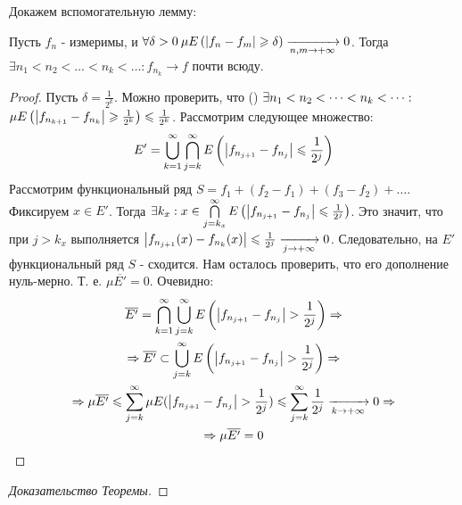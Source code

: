 Докажем вспомогательную лемму:

\begin{lemma}
	Пусть $f_n$ - измеримы, и $\forall\delta > 0\: \mu E\left(\left|f_n - f_m\right| \geqslant \delta\right) \xrightarrow[n,m \rightarrow +\infty]{} 0$.
	Тогда $\exists n_1 < n_2 < \dots < n_k < \dots : f_{n_k} \rightarrow f$ почти всюду.
\end{lemma}

\begin{proof}
	Пусть $\delta = \frac{1}{2^k}$. Можно проверить, что (\todo) 
	$\exists n_1 < n_2 < \dots < n_k < \dots: \\$
	$\mu E\left(\left|f_{n_{k + 1}} - f_{n_k}\right| \geqslant \frac{1}{2^k}\right) \leqslant \frac{1}{2^k}$.
	Рассмотрим следующее множество:
	\begin{gather*}
		E' = \bigcup\limits_{k = 1}^{\infty}\bigcap\limits_{j = k}^{\infty} E\left(\left|f_{n_{j + 1}} - f_{n_j}\right| \leqslant \frac{1}{2^j} \right)
	\end{gather*}
	Рассмотрим функциональный ряд $S = f_1 + (f_2 - f_1) + (f_3 - f_2) + \dots$. Фиксируем $x \in E'$. Тогда 
	$\\ \exists k_x : x \in \bigcap\limits_{j = k_x}^{\infty} E\left(\left|f_{n_{j + 1}} - f_{n_j}\right| \leqslant \frac{1}{2^j} \right)$.
	Это значит, что при $j > k_x$ выполняется $\left|f_{n_{j + 1}}(x) - f_{n_k}(x)\right| \leqslant \frac{1}{2^j} \xrightarrow[j \rightarrow +\infty]{} 0$.
	Следовательно, на $E'$ функциональный ряд $S$ - сходится. 
	Нам осталось проверить, что его дополнение нуль-мерно.
	Т. е. $\mu \overline{E'} = 0$. Очевидно:
	\begin{gather*}
		\overline{E'} = \bigcap\limits_{k = 1}^{\infty}\bigcup\limits_{j = k}^{\infty} E\left(\left|f_{n_{j + 1}} - f_{n_j}\right| > \frac{1}{2^j} \right) \Rightarrow \\
		\Rightarrow \overline{E'} \subset \bigcup\limits_{j = k}^{\infty} E\left(\left|f_{n_{j + 1}} - f_{n_j}\right| > \frac{1}{2^j} \right) \Rightarrow \\
		\Rightarrow \mu \overline{E'} \leqslant \sum\limits_{j = k}^{\infty} \mu E(\left|f_{n_{j + 1}} - f_{n_j}\right| > \frac{1}{2^j}) \leqslant 
		\sum\limits_{j = k}^{\infty} \frac{1}{2^j} \xrightarrow[k \rightarrow +\infty]{} 0 \Rightarrow \\
		\Rightarrow \mu \overline{E'} = 0
	\end{gather*}
\end{proof}

\newpage

\begin{proof}[Доказательство Теоремы]
\end{proof}


